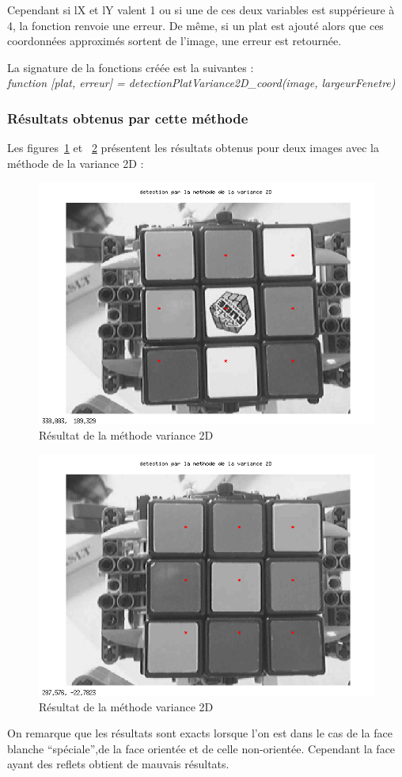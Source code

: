 \begin{enumerate}
  Cependant si lX et lY valent 1 ou si une de ces deux variables est suppérieure à 4, la fonction renvoie une erreur. 
De même, si un plat est ajouté alors que ces coordonnées approximés sortent de l'image, une erreur est retournée. 
\end{enumerate}

  La signature de la fonctions créée est la suivantes : \\
\textit{function [plat, erreur] = detectionPlatVariance2D\_coord(image, largeurFenetre)}


\subsubsection*{Résultats obtenus par cette méthode}

  Les figures~\ref{variance2D_resultat_1} et ~\ref{variance2D_resultat_2} présentent les résultats obtenus pour deux images avec la méthode de la variance 2D : 

\begin{figure}[!ht]
\centering
\includegraphics[width=0.6\linewidth]{Images/Variance2D_img_apres_1.png} 
\caption{Résultat de la méthode variance 2D} 
\label{variance2D_resultat_1}
\end{figure}

\begin{figure}[!ht]
\centering
\includegraphics[width=0.6\linewidth]{Images/Variance2D_img_apres_2.png}
\caption{Résultat de la méthode variance 2D} 
\label{variance2D_resultat_2}
\end{figure}

  On remarque que les résultats sont exacts lorsque l'on est dans le cas de la face blanche ``spéciale'',de la face orientée et de celle non-orientée. 
  Cependant la face ayant des reflets obtient de mauvais résultats. 
